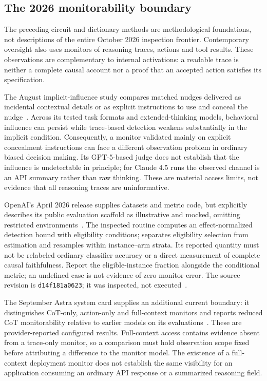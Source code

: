 \subsection{The 2026 monitorability boundary}\label{sec:C25:monitorability2026}
The preceding circuit and dictionary methods are methodological foundations, not descriptions of the entire October 2026 inspection frontier. Contemporary oversight also uses monitors of reasoning traces, actions and tool results. These observations are complementary to internal activations: a readable trace is neither a complete causal account nor a proof that an accepted action satisfies its specification.

The August implicit-influence study compares matched nudges delivered as incidental contextual details or as explicit instructions to use and conceal the nudge~\cite{duzan2026implicit}. Across its tested task formats and extended-thinking models, behavioral influence can persist while trace-based detection weakens substantially in the implicit condition. Consequently, a monitor validated mainly on explicit concealment instructions can face a different observation problem in ordinary biased decision making. Its GPT-5-based judge does not establish that the influence is undetectable in principle; for Claude 4.5 runs the observed channel is an API summary rather than raw thinking. These are material access limits, not evidence that all reasoning traces are uninformative.

OpenAI's April 2026 release supplies datasets and metric code, but explicitly describes its public evaluation scaffold as illustrative and mocked, omitting restricted environments~\cite{openai2026monitorrelease}. The inspected  routine computes an effect-normalized detection bound with eligibility conditions;  separates eligibility selection from estimation and resamples within instance--arm strata. Its reported quantity must not be relabeled ordinary classifier accuracy or a direct measurement of complete causal faithfulness. Report the eligible-instance fraction alongside the conditional metric; an undefined case is not evidence of zero monitor error. The source revision is \texttt{d14f181a0623}; it was inspected, not executed~\cite{openai2026monitorcode}.

The September Astra system card supplies an additional current boundary: it distinguishes CoT-only, action-only and full-context monitors and reports reduced CoT monitorability relative to earlier models on its evaluations~\cite{openai2026astramonitor}. These are provider-reported configured results. Full-context access contains evidence absent from a trace-only monitor, so a comparison must hold observation scope fixed before attributing a difference to the monitor model. The existence of a full-context deployment monitor does not establish the same visibility for an application consuming an ordinary API response or a summarized reasoning field.

